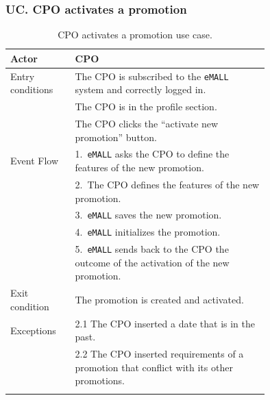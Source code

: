 \subsubsection*{UC\cuc . CPO activates a promotion}
\begin{center}
    \begin{longtable}{lp{0.75\linewidth}}
        \hline
        Actor            & CPO                                                                                        \\
        \hline
        Entry conditions & The CPO is subscribed to the \verb|eMALL| system and correctly logged in.                  \\
        & The CPO is in the profile section.                                                         \\
        & The CPO clicks the “activate new promotion” button.                                        \\
        \hline
        Event Flow       & 1.\ \verb|eMALL| asks the CPO to define the features of the new promotion.                 \\
        & 2.\ The CPO defines the features of the new promotion.                                     \\
        & 3.\ \verb|eMALL| saves the new promotion.                                                  \\
        & 4.\ \verb|eMALL| initializes the promotion.                                                \\
        & 5.\ \verb|eMALL| sends back to the CPO the outcome of the activation of the new promotion. \\
        \hline
        Exit condition   & The promotion is created and activated.                                                    \\
        \hline
        Exceptions       & 2.1 The CPO inserted a date that is in the past.                                           \\
        & 2.2 The CPO inserted requirements of a promotion that conflict with its other promotions.  \\
        \hline
        \caption{CPO activates a promotion use case.}
        \label{tab: CPO_activates_promotion_use_case}
    \end{longtable}


\end{center}
